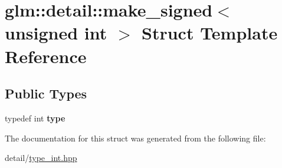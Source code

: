 \hypertarget{structglm_1_1detail_1_1make__signed_3_01unsigned_01int_01_4}{\section{glm\-:\-:detail\-:\-:make\-\_\-signed$<$ unsigned int $>$ Struct Template Reference}
\label{structglm_1_1detail_1_1make__signed_3_01unsigned_01int_01_4}
}
\subsection*{Public Types}
\begin{DoxyCompactItemize}
\item 
\hypertarget{structglm_1_1detail_1_1make__signed_3_01unsigned_01int_01_4_a78b4ada342bba40027f755d20eae141a}{typedef int {\bfseries type}}\label{structglm_1_1detail_1_1make__signed_3_01unsigned_01int_01_4_a78b4ada342bba40027f755d20eae141a}

\end{DoxyCompactItemize}


The documentation for this struct was generated from the following file\-:\begin{DoxyCompactItemize}
\item 
detail/\hyperlink{type__int_8hpp}{type\-\_\-int.\-hpp}\end{DoxyCompactItemize}
